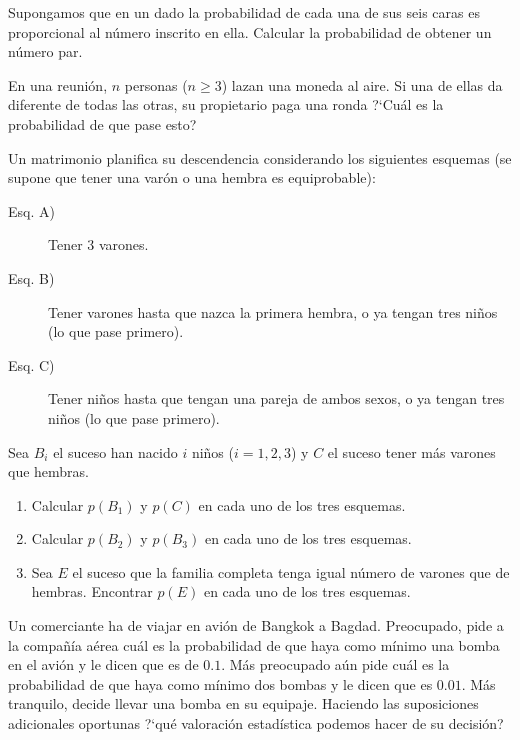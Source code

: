 \documentclass[12pt]{article}
\begin{document}
 \probl  Supongamos que en un dado la probabilidad de cada una de sus seis
 caras es proporcional al número inscrito en ella. Calcular la probabilidad
de obtener un número par. 

\probl  En una reunión, $n$ personas ($n \geq 3$) lazan una moneda
al  aire. Si una de ellas da diferente de todas las otras, su
propietario paga una ronda ?`Cuál es la probabilidad de que pase
esto? 





\probl  Un matrimonio planifica  su descendencia  considerando los
siguientes esquemas (se supone que tener una varón o una hembra es
equiprobable):
\begin{description}
\item[Esq. A)] Tener $3$ varones.
\item[Esq. B)] Tener varones hasta que nazca la primera hembra, o ya tengan tres
niños (lo que pase primero).
\item[Esq. C)] Tener niños hasta que tengan una pareja de ambos sexos,
 o ya tengan tres niños (lo que pase primero).
\end{description}
Sea $B_i$ el suceso  han nacido $i$ niños ($i=1, 2, 3$) y $C$ el suceso tener más varones
que hembras.
\begin{enumerate}[1)]
\item Calcular $p(B_1)$ y $p(C)$ en cada uno de  los tres esquemas.
\item Calcular $p(B_2)$ y $p(B_3)$ en cada uno de los tres esquemas.
\item Sea $E$ el suceso que la familia completa tenga igual número de
varones que de hembras. Encontrar $p(E)$ en cada uno de los tres
esquemas.

\end{enumerate}

\probl  Un comerciante ha de viajar en avión de Bangkok a Bagdad. Preocupado, pide a la
compañía aérea cuál es la probabilidad de que haya como mínimo una bomba en el avión y le
dicen que es de $0.1$. Más preocupado aún pide cuál es la probabilidad de que haya como
mínimo dos bombas y le dicen que es $0.01$. Más tranquilo, decide llevar una bomba en su
equipaje. Haciendo las suposiciones adicionales oportunas ?`qué  valoración estadística
podemos hacer de su decisión? 
\end{document}
